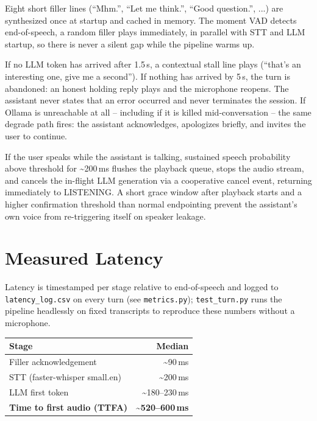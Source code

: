 \documentclass[11pt]{article}
\begin{document}
\begin{description}[leftmargin=4mm, itemsep=3pt]
\item[Layer 1 -- instant acknowledgement ($<$300\,ms).] Eight short filler lines (``Mhm.'',
``Let me think.'', ``Good question.'', ...) are synthesized once at startup and cached in
memory. The moment VAD detects end-of-speech, a random filler plays immediately, in parallel
with STT and LLM startup, so there is never a silent gap while the pipeline warms up.
\item[Layer 2 -- watchdog escalation.] If no LLM token has arrived after 1.5\,s, a contextual
stall line plays (``that's an interesting one, give me a second''). If nothing has arrived by
5\,s, the turn is abandoned: an honest holding reply plays and the microphone reopens. The
assistant never states that an error occurred and never terminates the session. If Ollama is
unreachable at all -- including if it is killed mid-conversation -- the same degrade path
fires: the assistant acknowledges, apologizes briefly, and invites the user to continue.
\item[Layer 3 -- barge-in.] If the user speaks while the assistant is talking, sustained
speech probability above threshold for \textasciitilde200\,ms flushes the playback queue,
stops the audio stream, and cancels the in-flight LLM generation via a cooperative cancel
event, returning immediately to LISTENING. A short grace window after playback starts and a
higher confirmation threshold than normal endpointing prevent the assistant's own voice from
re-triggering itself on speaker leakage.
\end{description}

\section{Measured Latency}

Latency is timestamped per stage relative to end-of-speech and logged to
\texttt{latency\_log.csv} on every turn (see \texttt{metrics.py}); \texttt{test\_turn.py} runs
the pipeline headlessly on fixed transcripts to reproduce these numbers without a microphone.

\begin{center}
\begin{tabular}{@{}lr@{}}
\toprule
\textbf{Stage} & \textbf{Median} \\
\midrule
Filler acknowledgement & \textasciitilde90\,ms \\
STT (faster-whisper small.en) & \textasciitilde200\,ms \\
LLM first token & \textasciitilde180--230\,ms \\
\textbf{Time to first audio (TTFA)} & \textbf{\textasciitilde520--600\,ms} \\
\bottomrule
\end{tabular}
\end{center}
\end{document}
